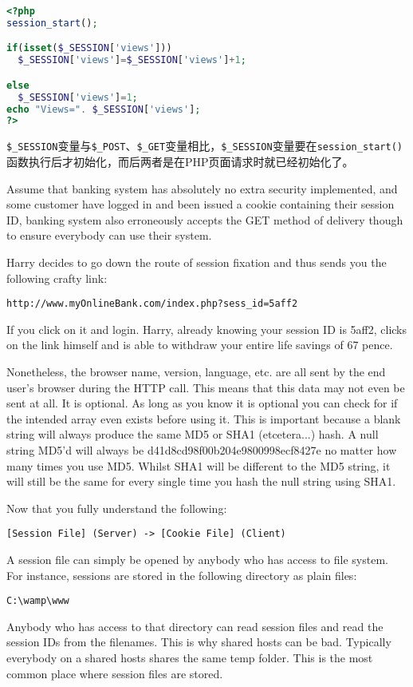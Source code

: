 \begin{lstlisting}[language=PHP]
<?php
session_start();

if(isset($_SESSION['views']))
  $_SESSION['views']=$_SESSION['views']+1;

else
  $_SESSION['views']=1;
echo "Views=". $_SESSION['views'];
?>
\end{lstlisting}

\texttt{\$\_SESSION}变量与\texttt{\$\_POST}、\texttt{\$\_GET}变量相比，\texttt{\$\_SESSION}变量要在\texttt{session\_start()}函数执行后才初始化，而后两者是在PHP页面请求时就已经初始化了。


Assume that banking system has absolutely no extra security implemented, and some customer have logged in and been issued a cookie containing their session ID, banking system also erroneously accepts the GET method of delivery though to ensure everybody can use their system. 

Harry decides to go down the route of session fixation and thus sends you the following crafty link:

\verb|http://www.myOnlineBank.com/index.php?sess_id=5aff2|

If you click on it and login. Harry, already knowing your session ID is 5aff2, clicks on the link himself and is able to withdraw your entire life savings of 67 pence.

Nonetheless, the browser name, version, language, etc. are all sent by the end user's browser during the HTTP call. This means that this data may not even be sent at all. It is optional. As long as you know it is optional you can check for if the intended array even exists before using it. This is important because a blank string will always produce the same MD5 or SHA1 (etcetera...) hash. A null string MD5'd will always be d41d8cd98f00b204e9800998ecf8427e no matter how many times you use MD5. Whilst SHA1 will be different to the MD5 string, it will still be the same for every single time you hash the null string using SHA1.

Now that you fully understand the following:

\verb|[Session File] (Server) -> [Cookie File] (Client)|

A session file can simply be opened by anybody who has access to file system. For instance, sessions are stored in the following directory as plain files:

\verb|C:\wamp\www|

Anybody who has access to that directory can read session files and read the session IDs from the filenames. This is why shared hosts can be bad. Typically everybody on a shared hosts shares the same temp folder. This is the most common place where session files are stored. 

